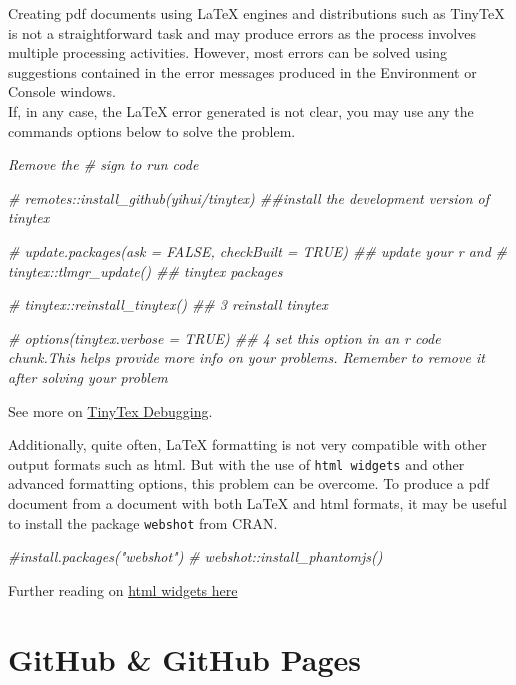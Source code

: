 \documentclass[
]{book}
\newenvironment{Shaded}{\begin{snugshade}}{\end{snugshade}}
\newcommand{\CommentTok}[1]{\textcolor[rgb]{0.56,0.35,0.01}{\textit{#1}}}
\begin{document}
Creating pdf documents using LaTeX engines and distributions such as TinyTeX is not a straightforward task and may produce errors as the process involves multiple processing activities. However, most errors can be solved using suggestions contained in the error messages produced in the Environment or Console windows.\\
If, in any case, the LaTeX error generated is not clear, you may use any the commands options below to solve the problem.

\emph{Remove the \# sign to run code}

\begin{Shaded}
\begin{Highlighting}[]
\CommentTok{\# remotes::install\_github(\textquotesingle{}yihui/tinytex\textquotesingle{}) \#\#install the development version of tinytex}

\CommentTok{\# update.packages(ask = FALSE, checkBuilt = TRUE) \#\# update your r and}
\CommentTok{\# tinytex::tlmgr\_update() \#\# tinytex packages}

\CommentTok{\# tinytex::reinstall\_tinytex()  \#\# 3 reinstall tinytex}

\CommentTok{\# options(tinytex.verbose = TRUE) \#\# 4 set this option in an r code chunk.This helps provide more info on your problems. Remember to remove it after solving your problem}
\end{Highlighting}
\end{Shaded}

See more on \href{https://yihui.org/tinytex/r/}{TinyTex Debugging}.

Additionally, quite often, LaTeX formatting is not very compatible with other output formats such as html. But with the use of \texttt{html\ widgets} and other advanced formatting options, this problem can be overcome.
To produce a pdf document from a document with both LaTeX and html formats, it may be useful to install the package \texttt{webshot} from CRAN.

\begin{Shaded}
\begin{Highlighting}[]
\CommentTok{\#install.packages("webshot")  }
\CommentTok{\# webshot::install\_phantomjs() }
\end{Highlighting}
\end{Shaded}

Further reading on \href{https://bookdown.org/yihui/bookdown/html-widgets.html}{html widgets here}

\hypertarget{github-github-pages}{%
\chapter{GitHub \& GitHub Pages}\label{github-github-pages}}
\end{document}
